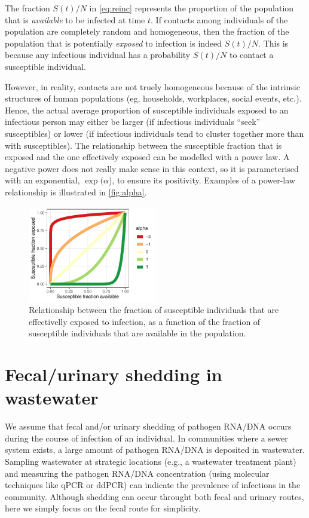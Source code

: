 \documentclass[11pt]{article} %
\begin{document}
The fraction $S(t)/N$ in \autoref{eq:reinc} represents the proportion of the population that is \emph{available} to be infected at time $t$. 
If contacts among individuals of the population are completely random and homogeneous, then the fraction of the population that is potentially \emph{exposed} to infection is indeed $S(t)/N$. This is because any infectious individual has a probability $S(t)/N$ to contact a susceptible individual. 

However, in reality, contacts are not truely homogeneous because of the intrinsic structures of human populations (eg, households, workplaces, social events, etc.). Hence, the actual average proportion of susceptible individuals exposed to an infectious person may either be larger (if infectious individuals ``seek'' susceptibles) or lower (if infectious individuals tend to cluster together more than with susceptibles). 
The relationship between the susceptible fraction that is exposed and the one effectively exposed can be modelled with a power law. A negative power does not really make sense in this context, so it is parameterised with an exponential, $\exp(\alpha$), to ensure its positivity.
Examples of a power-law relationship is illustrated in \autoref{fig:alpha}. 

\begin{figure}[h]
\begin{center}
\includegraphics[width=0.5\textwidth]{alpha.pdf}
\caption{Relationship between the fraction of susceptible individuals that are effectivelly exposed to infection, as a function of the fraction of susceptible individuals that are available in the population.}
\label{fig:alpha}
\end{center}
\end{figure}

\section{Fecal/urinary shedding in wastewater}

We assume that fecal and/or urinary shedding of pathogen RNA/DNA occurs during the course of infection of an individual. In communities where a sewer system exists, a large amount of pathogen RNA/DNA is deposited in wastewater. Sampling wastewater at strategic locations (e.g., a wastewater treatment plant) and measuring the pathogen RNA/DNA concentration (using molecular techniques like qPCR or ddPCR) can indicate the prevalence of infections in the community. 
Although shedding can occur throught both fecal and urinary routes, here we simply focus on the fecal route for simplicity. 
\end{document}
